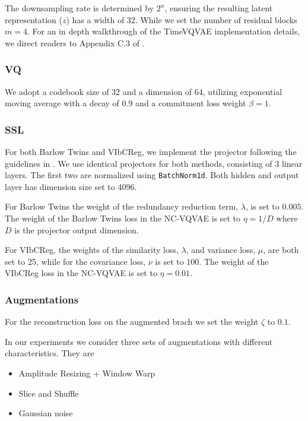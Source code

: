 \documentclass[../../thesis.tex]{subfiles}
\begin{document}
The downsampling rate is determined by $2^n$, ensuring the resulting latent representation ($z$) has a width of 32. While we set the number of residual blocks $m = 4$. For an in depth walkthrough of the TimeVQVAE implementation details, we direct readers to Appendix C.3 of \cite{TimeVQVAE}.


\subsubsection{VQ}

We adopt a codebook size of 32 and a dimension of 64, utilizing exponential moving average with a decay of 0.9 and a commitment loss weight $\beta = 1$.

\subsubsection{SSL}
For both Barlow Twins and VIbCReg, we implement the projector following the guidelines in \cite{lee2024computer}. 
We use identical projectors for both methods, consisting of 3 linear layers. The first two are normalized using \texttt{BatchNorm1d}. Both hidden and output layer has dimension size set to 4096.\newline

For Barlow Twins the weight of the redundancy reduction term, $\lambda$, is set to $0.005$. The weight of the Barlow Twins loss in the NC-VQVAE is set to $\eta = 1/D$ where $D$ is the projector output dimension.\newline

For VIbCReg, the weights of the similarity loss, $\lambda$, and variance loss, $\mu$, are both set to 25, while for the covariance loss, $\nu$ is set to 100. The weight of the VIbCReg loss in the NC-VQVAE is set to $\eta = 0.01$.

\subsubsection{Augmentations}
For the reconstruction loss on the augmented brach we set the weight $\zeta$ to $0.1$. \newline 

In our experiments we consider three sets of augmentations with different characteristics. They are
\begin{itemize}
    \item Amplitude Resizing + Window Warp
    \item Slice and Shuffle
    \item Gaussian noise
\end{itemize}
\end{document}
